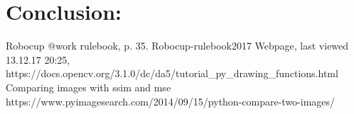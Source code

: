 \documentclass{article}
\begin{document}
\section{Conclusion:}


\begin{thebibliography}{99}
	 Robocup @work rulebook, p. 35. Robocup-rulebook2017
	 Webpage, last viewed 13.12.17 20:25, https://docs.opencv.org/3.1.0/dc/da5/tutorial\_py\_drawing\_functions.html
	 Comparing images with ssim and mse \\ https://www.pyimagesearch.com/2014/09/15/python-compare-two-images/
	\end{thebibliography}
\end{document}
